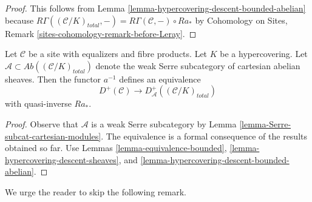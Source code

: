 \begin{proof}
This follows from Lemma \ref{lemma-hypercovering-descent-bounded-abelian}
because $R\Gamma((\mathcal{C}/K)_{total}, -) =
R\Gamma(\mathcal{C}, -) \circ Ra_*$ by
Cohomology on Sites, Remark \ref{sites-cohomology-remark-before-Leray}.
\end{proof}

\begin{lemma}
\label{lemma-hypercovering-equivalence-bounded}
Let $\mathcal{C}$ be a site with equalizers and fibre products.
Let $K$ be a hypercovering.
Let $\mathcal{A} \subset \textit{Ab}((\mathcal{C}/K)_{total})$
denote the weak Serre subcategory of cartesian abelian sheaves.
Then the functor $a^{-1}$ defines an equivalence
$$
D^+(\mathcal{C}) \longrightarrow D_\mathcal{A}^+((\mathcal{C}/K)_{total})
$$
with quasi-inverse $Ra_*$.
\end{lemma}

\begin{proof}
Observe that $\mathcal{A}$ is a weak Serre subcategory by
Lemma \ref{lemma-Serre-subcat-cartesian-modules}.
The equivalence is a
formal consequence of the results obtained so far. Use
Lemmas \ref{lemma-equivalence-bounded},
\ref{lemma-hypercovering-descent-sheaves}, and
\ref{lemma-hypercovering-descent-bounded-abelian}.
\end{proof}

\noindent
We urge the reader to skip the following remark.

